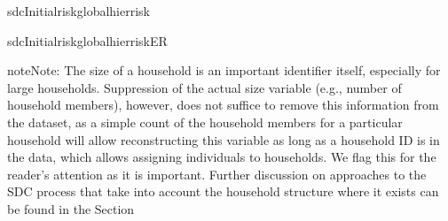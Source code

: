 \documentclass[letterpaper,10pt,english]{sphinxmanual}
\begin{document}
\def\sphinxLiteralBlockLabel{\label{\detokenize{measure_risk:code414}}}
%
\begin{sphinxVerbatim}[commandchars=\\\{\},numbers=left,firstnumber=1,stepnumber=1]
 sdcInitialriskglobalhier\PYGZus{}risk

 sdcInitialriskglobalhier\PYGZus{}risk\PYGZus{}ER
\end{sphinxVerbatim}

\begin{sphinxadmonition}{note}{Note:}
The size of a household is an important identifier itself,
especially for large households. Suppression of the actual size variable
(e.g., number of household members), however, does not suffice to remove
this information from the dataset, as a simple count of the household
members for a particular household will allow reconstructing this
variable as long as a household ID is in the data, which allows
assigning individuals to households. We flag this for the reader’s
attention as it is important. Further discussion on approaches to the
SDC process that take into account the household structure where it
exists can be found in the Section
\end{sphinxadmonition}
\end{document}
